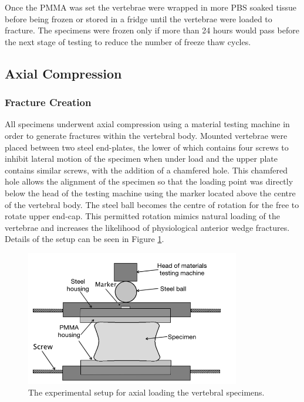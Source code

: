 Once the PMMA was set the vertebrae were wrapped in more PBS soaked
tissue before being frozen or stored in a fridge until the vertebrae
were loaded to fracture. The specimens were frozen only if more than 24 hours
would pass before the next stage of testing to reduce the number of
freeze thaw cycles.

\subsection{Axial Compression}\label{axial-compression}

\subsubsection{Fracture Creation}\label{fracture-creation}

All specimens underwent axial compression using a material testing machine
in order to generate fractures within the vertebral body. Mounted
vertebrae were placed between two steel end-plates, the lower of which
contains four screws to inhibit lateral motion of the specimen when
under load and the upper plate contains similar screws, with the
addition of a chamfered hole. This chamfered hole allows the
alignment of the specimen so that the loading point was directly below
the head of the testing machine using the marker located above the centre of the vertebral body. The steel ball becomes the centre of rotation for
the free to rotate upper end-cap. This permitted rotation mimics natural
loading of the vertebrae and increases the likelihood of physiological
anterior wedge fractures. Details of the setup can be seen in
Figure \ref{fig:expsetup}.

\begin{figure}[ht!]

\centering
\includegraphics[width=3.68472in]{images/instrom_loading_diag.png}
\caption{The experimental setup for axial loading the vertebral
specimens.}
\label{fig:expsetup}
\end{figure}

